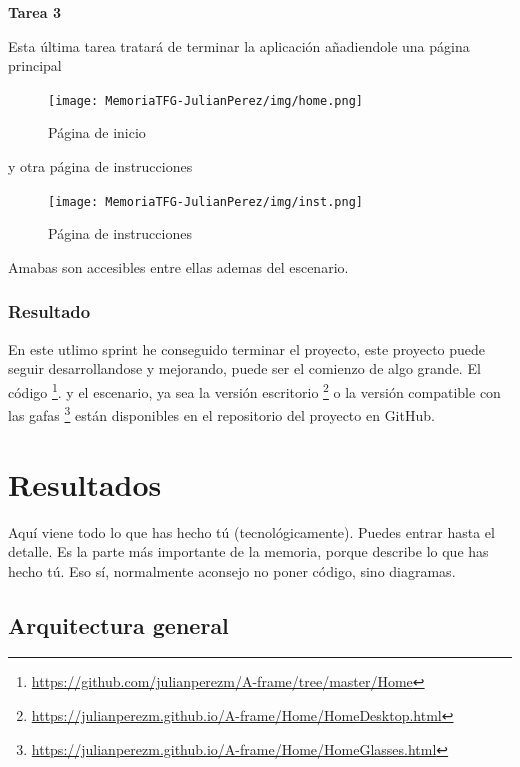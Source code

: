 \documentclass[a4paper, 12pt]{book}
\begin{document}
\textbf{Tarea 3}

Esta última tarea tratará de terminar la aplicación añadiendole una página principal

\begin{figure}[H]
  \centering
  \texttt{[image: MemoriaTFG-JulianPerez/img/home.png]}
  \caption{Página de inicio}\label{home}
\end{figure}

y otra página de instrucciones

\begin{figure}[H]
  \centering
  \texttt{[image: MemoriaTFG-JulianPerez/img/inst.png]}
  \caption{Página de instrucciones}\label{home}
\end{figure}

Amabas son accesibles entre ellas ademas del escenario.

\subsection{Resultado}

En este utlimo sprint he conseguido terminar el proyecto, este proyecto puede seguir desarrollandose y mejorando, puede ser el comienzo de algo grande. El código \footnote{\url{https://github.com/julianperezm/A-frame/tree/master/Home}}.  y el escenario, ya sea la versión escritorio \footnote{\url{https://julianperezm.github.io/A-frame/Home/HomeDesktop.html}} o la versión compatible con las gafas \footnote{\url{https://julianperezm.github.io/A-frame/Home/HomeGlasses.html}} están disponibles en el repositorio del proyecto en GitHub.







\cleardoublepage
\chapter{Resultados}

Aquí viene todo lo que has hecho tú (tecnológicamente). 
Puedes entrar hasta el detalle. 
Es la parte más importante de la memoria, porque describe lo que has hecho tú.
Eso sí, normalmente aconsejo no poner código, sino diagramas.

\section{Arquitectura general} 
\label{sec:arquitectura}
\end{document}
